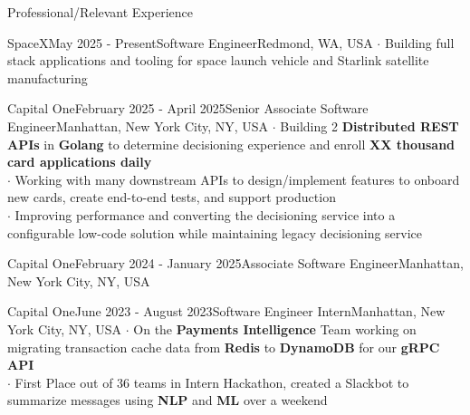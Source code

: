 \documentclass[UTF8]{resume} %
\begin{document}
\begin{rSection}{Professional/Relevant Experience}
    \begin{rSubsection}{SpaceX}{May 2025 - Present}{Software Engineer}{Redmond, WA, USA}
        $\cdot$ Building full stack applications and tooling for space launch vehicle and Starlink satellite manufacturing
     \end{rSubsection}
\begin{rSubsection}{Capital One}{February 2025 - April 2025}{Senior Associate Software Engineer}{Manhattan, New York City, NY, USA}
   $\cdot$ Building 2 \textbf{Distributed REST APIs} in \textbf{Golang} to determine decisioning experience and enroll \textbf{XX thousand card applications daily} \\
   $\cdot$ Working with many downstream APIs to design/implement features to onboard new cards, create end-to-end tests, and support production \\ 
   $\cdot$ Improving performance and converting the decisioning service into a configurable low-code solution while maintaining legacy decisioning service
\end{rSubsection}
\begin{rSubsection}{Capital One}{February 2024 - January 2025}{Associate Software Engineer}{Manhattan, New York City, NY, USA}
\end{rSubsection}
\begin{rSubsection}{Capital One}{June 2023 - August 2023}{Software Engineer Intern}{Manhattan, New York City, NY, USA}
    $\cdot$ On the \textbf{Payments Intelligence} Team working on migrating transaction cache data from \textbf{Redis} to \textbf{DynamoDB} for our \textbf{gRPC API}\\
    $\cdot$ First Place out of 36 teams in Intern Hackathon, created a Slackbot to summarize messages using \textbf{NLP} and \textbf{ML} over a weekend
\end{rSubsection}

\end{rSection}
\end{document}
